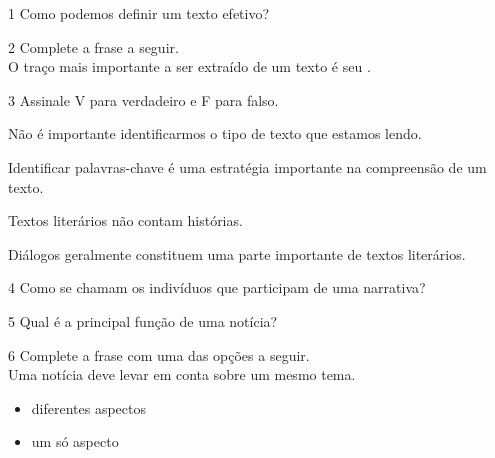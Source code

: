 
\num{1} Como podemos definir um texto efetivo?



\num{2} Complete a frase a seguir.\\
O traço mais importante a ser extraído de um texto é seu \preencher.



\num{3} Assinale V para verdadeiro e F para falso.

\begin{boxlist}
\item Não é importante identificarmos o tipo de texto que estamos lendo. 

\item Identificar palavras-chave é uma estratégia importante na
compreensão de um texto. 

\item Textos literários não contam histórias. 

\item Diálogos geralmente constituem uma parte importante de textos
literários. 
\end{boxlist}

\num{4} Como se chamam os indivíduos que participam de uma narrativa?



\num{5} Qual é a principal função de uma notícia?



\num{6} Complete a frase com uma das opções a seguir.\\
Uma notícia deve levar em conta \preencher sobre um mesmo tema.

\begin{itemize}
	\item diferentes aspectos
	\item um só aspecto
\end{itemize}

